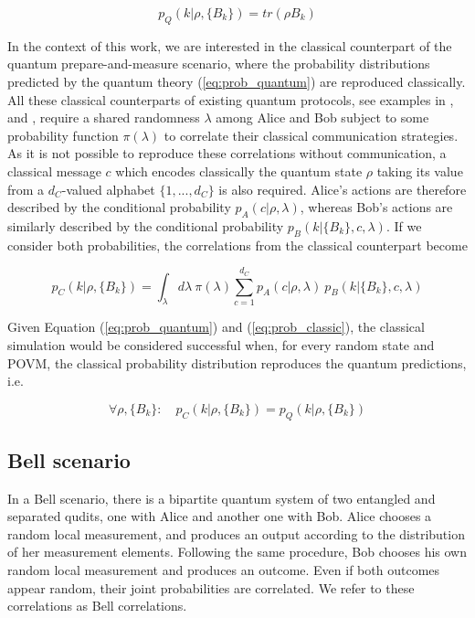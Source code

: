 \begin{equation}\label{eq:prob_quantum}
p_Q(k|\rho,\{B_{k}\}) = tr(\rho B_{k})
\end{equation}

In the context of this work, we are interested in the classical counterpart of the quantum prepare-and-measure scenario, where the probability distributions predicted by the quantum theory (\ref{eq:prob_quantum}) are reproduced classically. All these classical counterparts of existing quantum protocols, see examples in \cite{cerf2000}, \cite{toner2003} and \cite{renner2022}, require a shared randomness $\lambda$ among Alice and Bob subject to some probability function $\pi(\lambda)$ to correlate their classical communication strategies. As it is not possible to reproduce these correlations without communication, a classical message $c$ which encodes classically the quantum state $\rho$ taking its value from a $d_C$-valued alphabet $\{1,...,d_C\}$ is also required. Alice's actions are therefore described by the conditional probability $p_A(c|\rho,\lambda)$, whereas Bob's actions are similarly described by the conditional probability $p_B(k|\{B_{k}\},c,\lambda)$. If we consider both probabilities, the correlations from the classical counterpart become

\begin{equation}\label{eq:prob_classic}
p_C(k|\rho,\{B_{k}\}) = \int_{\lambda} d\lambda\ \pi(\lambda) \sum_{c=1}^{d_C} p_A(c|\rho, \lambda)\ p_B(k|\{B_{k}\}, c, \lambda)
\end{equation}

Given Equation (\ref{eq:prob_quantum}) and (\ref{eq:prob_classic}), the classical simulation would be considered successful when, for every random state and POVM, the classical probability distribution reproduces the quantum predictions, i.e.

\begin{equation}\label{eq:prob_classic_quantum}
\forall \rho, \{B_{k}\}:\quad p_C(k|\rho,\{B_{k}\}) = p_Q(k|\rho,\{B_{k}\})
\end{equation}

\subsection{Bell scenario}
In a Bell scenario, there is a bipartite quantum system of two entangled and separated qudits, one with Alice and another one with Bob. 
Alice chooses a random local measurement, and produces an output according to the distribution of her measurement elements. Following the same procedure, Bob chooses his own random local measurement and produces an outcome. Even if both outcomes appear random, their joint probabilities are correlated. We refer to these correlations as Bell correlations.

